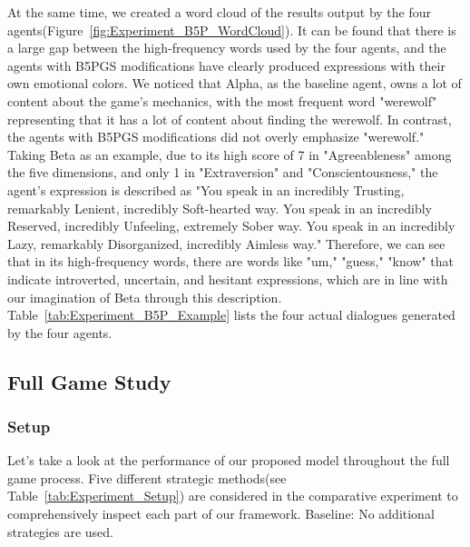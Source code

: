 At the same time, we created a word cloud of the results output by the four agents(Figure~\ref{fig:Experiment_B5P_WordCloud}). It can be found that there is a large gap between the high-frequency words used by the four agents, and the agents with B5PGS modifications have clearly produced expressions with their own emotional colors. We noticed that Alpha, as the baseline agent, owns a lot of content about the game's mechanics, with the most frequent word "werewolf" representing that it has a lot of content about finding the werewolf. In contrast, the agents with B5PGS modifications did not overly emphasize "werewolf." Taking Beta as an example, due to its high score of 7 in "Agreeableness" among the five dimensions, and only 1 in "Extraversion" and "Conscientousness," the agent's expression is described as "You speak in an incredibly Trusting, remarkably Lenient, incredibly Soft-hearted way. You speak in an incredibly Reserved, incredibly Unfeeling, extremely Sober way. You speak in an incredibly Lazy, remarkably Disorganized, incredibly Aimless way." Therefore, we can see that in its high-frequency words, there are words like "um," "guess," "know" that indicate introverted, uncertain, and hesitant expressions, which are in line with our imagination of Beta through this description. Table~\ref{tab:Experiment_B5P_Example} lists the four actual dialogues generated by the four agents.




\subsection{Full Game Study}

\subsubsection{Setup} \label{sec:FullGameStudy_Setup}

Let's take a look at the performance of our proposed model throughout the full game process. Five different strategic methods(see Table~\ref{tab:Experiment_Setup}) are considered in the comparative experiment to comprehensively inspect each part of our framework.  
Baseline: No additional strategies are used.

